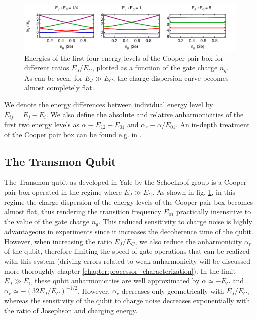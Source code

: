 \begin{figure}[ht!]
	\includegraphics[width=\textwidth]{"./material/mathematica/cooper_pair_box_energies"}
	\caption{Energies of the first four energy levels of the Cooper pair box for different ratios $E_J/E_C$, plotted as a function of the gate charge $n_g$. As can be seen, for $E_J \gg E_C$, the charge-dispersion curve becomes almost completely flat.}
	\label{fig:CooperPairBoxEnergies}
\end{figure}

We denote the energy differences between individual energy level by $E_{ij} = E_j - E_i$. We also define the absolute and relative anharmonicities of the first two energy levels as $\alpha \equiv E_{12}-E_{01}$ and $\alpha_r \equiv \alpha / E_{01}$. An in-depth treatment of the Cooper pair box can be found e.g. in \citep{cottet_implementation_2002}.

\subsection{The Transmon Qubit}

The Transmon qubit as developed in Yale by the Schoelkopf group \cite{koch_charge-insensitive_2007,wallraff_strong_2004} is a Cooper pair box operated in the regime where $E_J \gg E_C$. As shown in fig. \ref{fig:CooperPairBoxEnergies}, in this regime the charge dispersion of the energy levels of the Cooper pair box becomes almost flat, thus rendering the transition frequency $E_{01}$ practically insensitive to the value of the gate charge $n_g$. This reduced sensitivity to charge noise is highly advantageous in experiments since it increases the decoherence time of the qubit. However, when increasing the ratio $E_J/E_C$, we also reduce the anharmonicity $\alpha_r$ of the qubit, therefore limiting the speed of gate operations that can be realized with this system (driving errors related to weak anharmonicity will be discussed more thoroughly chapter \ref{chapter:processor_characterization}). In the limit $E_J \gg E_C$ these qubit anharmonicities are well approximated by $\alpha \simeq -E_C$ and $\alpha_r \simeq -(32 E_J / E_C)^{-1/2}$. However, $\alpha_r$ decreases only geometrically with $E_J/E_C$, whereas the sensitivity of the qubit to charge noise decreases exponentially with the ratio of Josephson and charging energy.

